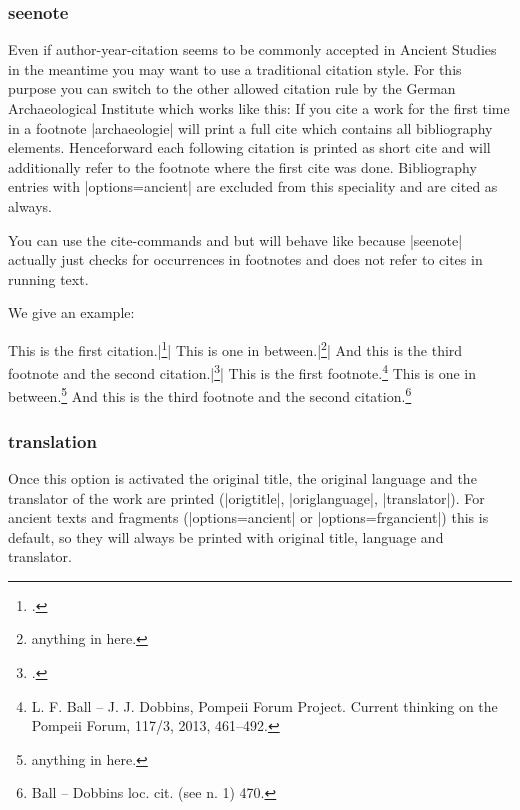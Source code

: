 \documentclass[a4paper,
10pt,
greek,
french,
spanish,
italian,
ngerman,
english
]{ltxdoc}
\begin{document}
\subsubsection{seenote}\label{seenote}
Even if author-year-citation seems to be commonly accepted in Ancient Studies in the meantime you may want to use a traditional citation style. 
For this purpose you can switch to the other allowed citation rule by the German Archaeological Institute
which works like this:
If you cite a work for the first time in a footnote |archaeologie| will print a full cite which contains all bibliography elements.
Henceforward each following citation is printed as short cite and will additionally refer to the footnote where the first cite was done.
Bibliography entries with |options={ancient}| are excluded from this speciality and are cited as always.

You can use the cite-commands  and  but  
will behave like  because |seenote| actually just checks for occurrences in footnotes and does not refer to cites in running text.

We give an example:
\begin{tcolorbox}[examplebox] 
This is the first citation.|\footnote{\cite{Ball2013}.}|
This is one in between.|\footnote{anything in here.}|
And this is the third footnote and the second citation.|\footnote{\cite[470]{Ball2013}.}|
\tcblower
This is the first footnote.\footnote{L. F. Ball – J. J. Dobbins, Pompeii Forum Project. Current thinking on the Pompeii Forum, 117/3, 2013, 461–492.}
This is one in between.\footnote{anything in here.}
And this is the third footnote and the second citation.\footnote{Ball – Dobbins loc. cit. (see n. 1) 470.}
\end{tcolorbox}




\subsubsection{translation}\label{translation}
Once this option is activated the original title, the original language and the translator of the work are printed (|origtitle|, |origlanguage|, |translator|).
For ancient texts and fragments (|options={ancient}| or |options={frgancient}|) this is default, 
so they will always be printed with original title, language and translator.
\end{document}
